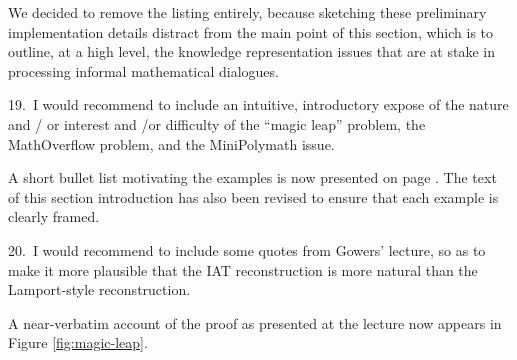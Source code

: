 We decided to remove the listing entirely, because sketching these preliminary implementation details
distract from the main point of this section, which is to outline, at a high level, the knowledge representation issues that are at stake in processing informal mathematical dialogues.



\begin{mdframed}[backgroundcolor=orange!10]
19.~I would recommend to include an intuitive, introductory expose of the nature and  / or interest and /or difficulty of the ``magic leap'' problem, the MathOverflow problem, and the MiniPolymath issue.
\end{mdframed}

A short bullet list motivating the examples is now presented on page \pageref{list:motivation-for-examples}.
The text of this section introduction has also been revised to ensure that each example is clearly framed.

\begin{mdframed}[backgroundcolor=orange!10]
20.~I would recommend to include some quotes from Gowers' lecture, so as to make it more plausible that the IAT reconstruction is more natural than the Lamport-style reconstruction.
\end{mdframed}

A near-verbatim account of the proof as presented at the lecture now appears in Figure \ref{fig:magic-leap}.

